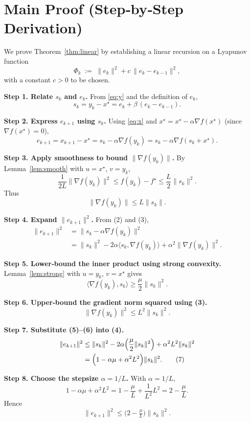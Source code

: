 \documentclass{article}
\begin{document}
\section*{Main Proof (Step‑by‑Step Derivation)}
We prove Theorem~\ref{thm:linear} by establishing a linear recursion on a Lyapunov function
\[
\Phi_{k}\;:=\; \|e_{k}\|^{2}+c\,\|e_{k}-e_{k-1}\|^{2},
\]
with a constant $c>0$ to be chosen.

\noindent\textbf{Step 1.  Relate $s_{k}$ and $e_{k}$.}  
From \eqref{eq:y} and the definition of $e_{k}$,
\[
s_{k}=y_{k}-x^{\star}=e_{k}+ \beta\,(e_{k}-e_{k-1}).\tag{1}
\]

\noindent\textbf{Step 2.  Express $e_{k+1}$ using $s_{k}$.}  
Using \eqref{eq:x} and $x^{\star}=x^{\star}-\alpha\nabla f(x^{\star})$ (since $\nabla f(x^{\star})=0$),
\[
e_{k+1}=x_{k+1}-x^{\star}=s_{k}-\alpha\nabla f(y_{k})=s_{k}-\alpha\nabla f(s_{k}+x^{\star}).\tag{2}
\]

\noindent\textbf{Step 3.  Apply smoothness to bound $\|\nabla f(y_{k})\|$.}  
By Lemma~\ref{lem:smooth} with $u=x^{\star}$, $v=y_{k}$,
\[
\frac{1}{2L}\|\nabla f(y_{k})\|^{2}\le f(y_{k})-f^{\star}\le\frac{L}{2}\|s_{k}\|^{2}.
\]
Thus
\[
\|\nabla f(y_{k})\|\le L\|s_{k}\|.\tag{3}
\]

\noindent\textbf{Step 4.  Expand $\|e_{k+1}\|^{2}$.}  
From (2) and (3),
\begin{align}
\|e_{k+1}\|^{2}
&=\|s_{k}-\alpha\nabla f(y_{k})\|^{2}\nonumber\\
&=\|s_{k}\|^{2}-2\alpha\langle s_{k},\nabla f(y_{k})\rangle+\alpha^{2}\|\nabla f(y_{k})\|^{2}.\tag{4}
\end{align}

\noindent\textbf{Step 5.  Lower‑bound the inner product using strong convexity.}  
Lemma~\ref{lem:strong} with $u=y_{k}$, $v=x^{\star}$ gives
\[
\langle\nabla f(y_{k}),s_{k}\rangle\ge \frac{\mu}{2}\|s_{k}\|^{2}.\tag{5}
\]

\noindent\textbf{Step 6.  Upper‑bound the gradient norm squared using (3).}  
\[
\|\nabla f(y_{k})\|^{2}\le L^{2}\|s_{k}\|^{2}.\tag{6}
\]

\noindent\textbf{Step 7.  Substitute (5)–(6) into (4).}  
\begin{align}
\|e_{k+1}\|^{2}
&\le\|s_{k}\|^{2}-2\alpha\!\left(\frac{\mu}{2}\|s_{k}\|^{2}\right)+\alpha^{2}L^{2}\|s_{k}\|^{2}\nonumber\\
&=\Bigl(1-\alpha\mu+\alpha^{2}L^{2}\Bigr)\|s_{k}\|^{2}.\tag{7}
\end{align}

\noindent\textbf{Step 8.  Choose the stepsize $\alpha=1/L$.}  
With $\alpha=1/L$,
\[
1-\alpha\mu+\alpha^{2}L^{2}=1-\frac{\mu}{L}+ \frac{1}{L^{2}}L^{2}=2-\frac{\mu}{L}.\tag{8}
\]
Hence
\[
\|e_{k+1}\|^{2}\le\bigl(2-\tfrac{\mu}{L}\bigr)\|s_{k}\|^{2}.\tag{9}
\]
\end{document}
